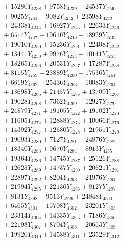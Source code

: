 \documentclass[a4paper,10pt]{article}
\begin{document}
{\begin{align}
&\;  + 15280 Y_{4238} + 9758 Y_{4239} + 24537 Y_{4240} \\[0.3ex]
&\;  + 9025 Y_{4241} + 9082 Y_{4242} + 23598 Y_{4243} \\[0.3ex]
&\;  + 24338 Y_{4244} + 16927 Y_{4245} + 22633 Y_{4246} \\[0.3ex]
&\;  + 6514 Y_{4247} + 19610 Y_{4248} + 18929 Y_{4249} \\[0.3ex]
&\;  + 19010 Y_{4250} + 15236 Y_{4251} + 22408 Y_{4252} \\[0.3ex]
&\;  + 13441 Y_{4253} + 9976 Y_{4254} + 10141 Y_{4255} \\[0.3ex]
&\;  + 18265 Y_{4256} + 20531 Y_{4257} + 17287 Y_{4258} \\[0.5ex]\allowbreak
&\;  + 8115 Y_{4259} + 23889 Y_{4260} + 17536 Y_{4261} \\[0.3ex]
&\;  + 6619 Y_{4262} + 25436 Y_{4263} + 10083 Y_{4264} \\[0.3ex]
&\;  + 13698 Y_{4265} + 21457 Y_{4266} + 13709 Y_{4267} \\[0.3ex]
&\;  + 19028 Y_{4268} + 7362 Y_{4269} + 12927 Y_{4270} \\[0.3ex]
&\;  + 24879 Y_{4271} + 19105 Y_{4272} + 19102 Y_{4273} \\[0.3ex]
&\;  + 11605 Y_{4274} + 12888 Y_{4275} + 10066 Y_{4276} \\[0.3ex]
&\;  + 14392 Y_{4277} + 12680 Y_{4278} + 21951 Y_{4279} \\[0.3ex]
&\;  + 19093 Y_{4280} + 7127 Y_{4281} + 24876 Y_{4282} \\[0.3ex]
&\;  + 18340 Y_{4283} + 9670 Y_{4284} + 8913 Y_{4285} \\[0.3ex]
&\;  + 19364 Y_{4286} + 14745 Y_{4287} + 25126 Y_{4288} \\[0.5ex]\allowbreak
&\;  + 12625 Y_{4289} + 14737 Y_{4290} + 20621 Y_{4291} \\[0.3ex]
&\;  + 22897 Y_{4292} + 8204 Y_{4293} + 21976 Y_{4294} \\[0.3ex]
&\;  + 21994 Y_{4295} + 22136 Y_{4296} + 8127 Y_{4297} \\[0.3ex]
&\;  + 8131 Y_{4298} + 9513 Y_{4299} + 24848 Y_{4300} \\[0.3ex]
&\;  + 6465 Y_{4301} + 15708 Y_{4302} + 23201 Y_{4303} \\[0.3ex]
&\;  + 23314 Y_{4304} + 14335 Y_{4305} + 7186 Y_{4306} \\[0.3ex]
&\;  + 22198 Y_{4307} + 8704 Y_{4308} + 20653 Y_{4309} \\[0.3ex]
&\;  + 19920 Y_{4310} + 14588 Y_{4311} + 23529 Y_{4312} \\[0.3ex]

\end{align}}
\end{document}
